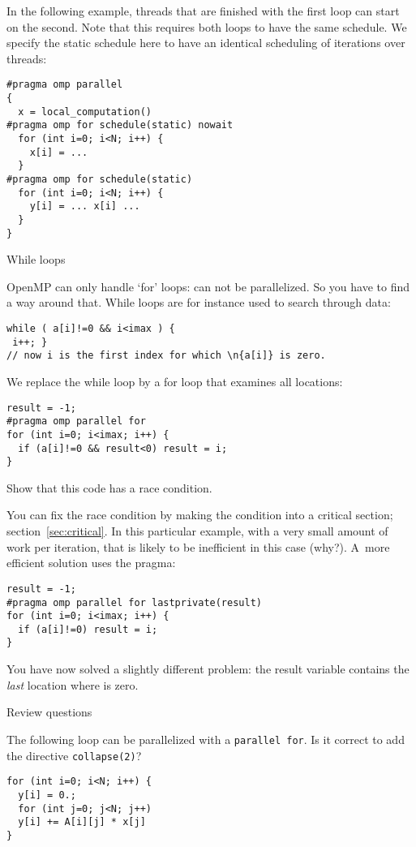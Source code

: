 In the following example, threads that are finished with the first loop
can start on the second. Note that this requires both loops to have
the same schedule. We specify the static schedule here to have an
identical scheduling of iterations over threads:
\begin{lstlisting}
#pragma omp parallel
{
  x = local_computation()
#pragma omp for schedule(static) nowait
  for (int i=0; i<N; i++) { 
    x[i] = ... 
  }
#pragma omp for schedule(static)
  for (int i=0; i<N; i++) { 
    y[i] = ... x[i] ...
  }
}
\end{lstlisting}

 {While loops}

OpenMP can only handle `for' loops:  can not
be parallelized. So you have to find a way around that. While loops
are for instance used to search through data:
\begin{lstlisting}
while ( a[i]!=0 && i<imax ) {
 i++; }
// now i is the first index for which \n{a[i]} is zero.
\end{lstlisting}
We replace the while loop by a for loop that examines all locations:
\begin{lstlisting}
result = -1;
#pragma omp parallel for
for (int i=0; i<imax; i++) {
  if (a[i]!=0 && result<0) result = i;
}
\end{lstlisting}
\begin{exercise}
  Show that this code has a race condition.
\end{exercise}
You can fix the race condition by making the condition into a critical section;
section~\ref{sec:critical}. In this particular example, with a very small amount
of work per iteration, that is likely to be inefficient 
in this case (why?).
A~more efficient solution uses the  pragma:
\begin{lstlisting}
result = -1;
#pragma omp parallel for lastprivate(result)
for (int i=0; i<imax; i++) {
  if (a[i]!=0) result = i;
}
\end{lstlisting}
You have now solved a slightly different problem: the result variable
contains the \emph{last} location where  is zero.

 {Review questions}

\begin{exercise}
  The following loop can be parallelized with a \lstinline+parallel for+.
  Is it correct to add the directive \lstinline+collapse(2)+?

\begin{lstlisting}
for (int i=0; i<N; i++) {
  y[i] = 0.;
  for (int j=0; j<N; j++)
  y[i] += A[i][j] * x[j]
}
\end{lstlisting}
\end{exercise}

